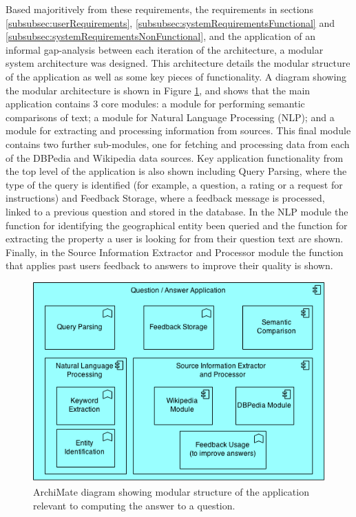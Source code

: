 \documentclass[authoryearcitations]{UoYCSproject}
\begin{document}
Based majoritively from these requirements, the requirements in sections \ref{subsubsec:userRequirements}, \ref{subsubsec:systemRequirementsFunctional} and \ref{subsubsec:systemRequirementsNonFunctional}, and the application of an informal gap-analysis between each iteration of the architecture, a modular system architecture was designed. This architecture details the modular structure of the application as well as some key pieces of functionality. A diagram showing the modular architecture is shown in Figure \ref{fig:systemArchitecture}, and shows that the main application contains 3 core modules: a module for performing semantic comparisons of text; a module for Natural Language Processing (NLP); and a module for extracting and processing information from sources. This final module contains two further sub-modules, one for fetching and processing data from each of the DBPedia and Wikipedia data sources. Key application functionality from the top level of the application is also shown including Query Parsing, where the type of the query is identified (for example, a question, a rating or a request for instructions) and Feedback Storage, where a feedback message is processed, linked to a previous question and stored in the database. In the NLP module the function for identifying the geographical entity been queried and the function for extracting the property a user is looking for from their question text are shown. Finally, in the Source Information Extractor and Processor module the function that applies past users feedback to answers to improve their quality is shown.

\begin{figure}[htb] 
\includegraphics[width=\linewidth]{systemArchitecture}
\caption{ArchiMate diagram showing modular structure of the application relevant to computing the answer to a question.}
\label{fig:systemArchitecture}
\end{figure}
\end{document}
